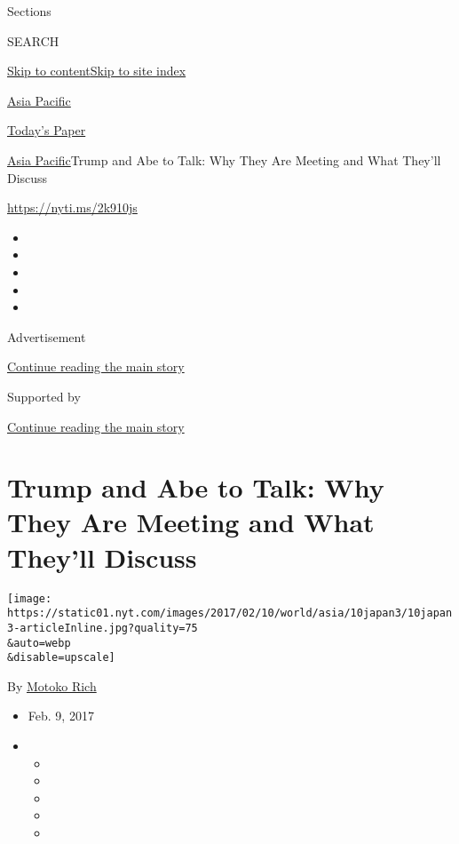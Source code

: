 Sections

SEARCH

\protect\hyperlink{site-content}{Skip to
content}\protect\hyperlink{site-index}{Skip to site index}

\href{https://www.nytimes.com/section/world/asia}{Asia Pacific}

\href{https://myaccount.nytimes.com/auth/login?response_type=cookie\&client_id=vi}{}

\href{https://www.nytimes.com/section/todayspaper}{Today's Paper}

\href{/section/world/asia}{Asia Pacific}\textbar{}Trump and Abe to Talk:
Why They Are Meeting and What They'll Discuss

\url{https://nyti.ms/2k910js}

\begin{itemize}
\item
\item
\item
\item
\item
\end{itemize}

Advertisement

\protect\hyperlink{after-top}{Continue reading the main story}

Supported by

\protect\hyperlink{after-sponsor}{Continue reading the main story}

\hypertarget{trump-and-abe-to-talk-why-they-are-meeting-and-what-theyll-discuss}{%
\section{Trump and Abe to Talk: Why They Are Meeting and What They'll
Discuss}\label{trump-and-abe-to-talk-why-they-are-meeting-and-what-theyll-discuss}}

\texttt{[image: https://static01.nyt.com/images/2017/02/10/world/asia/10japan3/10japan3-articleInline.jpg?quality=75\\\&auto=webp\\\&disable=upscale]}

By \href{http://www.nytimes.com/by/motoko-rich}{Motoko Rich}

\begin{itemize}
\item
  Feb. 9, 2017
\item
  \begin{itemize}
  \item
  \item
  \item
  \item
  \item
  \end{itemize}
\end{itemize}

